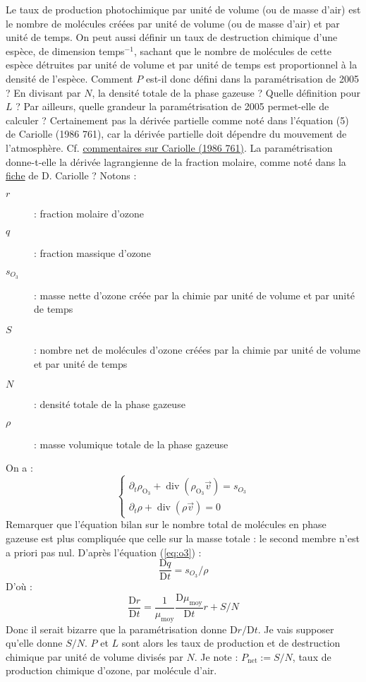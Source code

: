 \documentclass[a4paper,english,french]{article}
\newcommand{\uD}{\mathrm{D}}
\DeclareMathOperator{\diverg}{div}
\begin{document}
Le taux de production photochimique par unité de volume (ou de masse
d'air) est le nombre de molécules créées par unité de volume (ou de
masse d'air) et par unité de temps. On peut aussi définir un taux de
destruction chimique d'une espèce, de dimension temps$^{-1}$, sachant
que le nombre de molécules de cette espèce détruites par unité de
volume et par unité de temps est proportionnel à la densité de
l'espèce. Comment $P$ est-il donc défini dans la paramétrisation de
2005 ?  En divisant par $N$, la densité totale de la phase gazeuse ?
Quelle définition pour $L$ ? Par ailleurs, quelle grandeur la
paramétrisation de 2005 permet-elle de calculer ? Certainement pas la
dérivée partielle comme noté dans l'équation (5) de Cariolle (1986
761), car la dérivée partielle doit dépendre du mouvement de
l'atmosphère. Cf.
\href{file:/user/guez/Documents/Commentaires_lectures/Autres_publications/-1991/Cariolle_1986_761.texfol/Cariolle_1986_761.dvi}{commentaires
  sur Cariolle (1986 761)}. La paramétrisation donne-t-elle la
dérivée lagrangienne de la fraction molaire, comme noté dans la
\href{file:///user/guez/Documents/Informatique_fonctionnement/O3_Cariolle.txt}{fiche}
de D. Cariolle ?  Notons :
\begin{description}
\item[$r$] : fraction molaire d'ozone
\item[$q$] : fraction massique d'ozone
\item[$s_{O_3}$] : masse nette d'ozone créée par la chimie par unité de
  volume et par unité de temps
\item[$S$] : nombre net de molécules d'ozone créées par la chimie par
  unité de volume et par unité de temps
\item[$N$] : densité totale de la phase gazeuse
\item[$\rho$] : masse volumique totale de la phase gazeuse
\end{description}
On a :
\begin{equation}
  \label{eq:o3}
  \left\{
    \begin{array}{l}
      \partial_t \rho_{\mathrm{O}_3} + \diverg(\rho_{\mathrm{O}_3} \vec v)
      = s_{O_3} \\
      \partial_t \rho + \diverg(\rho \vec v) = 0
    \end{array}
  \right.
\end{equation}
Remarquer que l'équation bilan sur le nombre total de molécules en
phase gazeuse est plus compliquée que celle sur la masse totale : le
second membre n'est a priori pas nul. D'après l'équation (\ref{eq:o3})
:
\begin{equation}
  \label{eq:dqdt}
  \frac{\uD q}{\uD t} = s_{O_3} / \rho
\end{equation}
D'où :
\begin{displaymath}
  \frac{\uD r}{\uD t}
  =
  \frac{1}{\mu_\mathrm{moy}} \frac{\uD \mu_\mathrm{moy}}{\uD t} r + S / N
\end{displaymath}
Donc il serait bizarre que la paramétrisation donne $\uD r/\uD t$. Je
vais supposer qu'elle donne $S/N$. $P$ et $L$ sont alors les taux de
production et de destruction chimique par unité de volume divisés par
$N$. Je note : $P_\mathrm{net} := S / N$, taux de production chimique
d'ozone, par molécule d'air.
\end{document}
